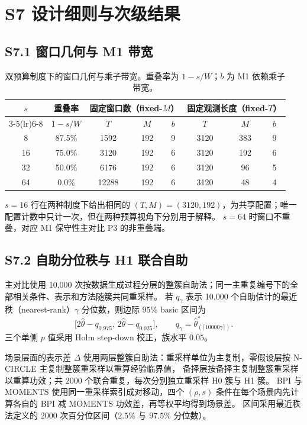 \documentclass[UTF8,zihao=-4]{ctexart}
\theoremstyle{remark}
\begin{document}
\section*{S7 设计细则与次级结果}

\subsection*{S7.1 窗口几何与 M1 带宽}
\begin{table}[ht]
\centering
\small
\caption{双预算制度下的窗口几何与乘子带宽。重叠率为 $1-s/W$；$b$ 为 M1 依赖乘子带宽。}\label{tab:s7-design}
\begin{tabular}{cccccccc}
\toprule
$s$ & 重叠率 & \multicolumn{3}{c}{固定窗口数（fixed-$M$）} & \multicolumn{3}{c}{固定观测长度（fixed-$T$）}\\
\cmidrule(lr){3-5}\cmidrule(lr){6-8}
 & $1-s/W$ & $T$ & $M$ & $b$ & $T$ & $M$ & $b$\\
\midrule
8 & 87.5\% & 1592 & 192 & 9 & 3120 & 383 & 9 \\
16 & 75.0\% & 3120 & 192 & 6 & 3120 & 192 & 6 \\
32 & 50.0\% & 6176 & 192 & 6 & 3120 & 96 & 5 \\
64 & 0.0\% & 12288 & 192 & 6 & 3120 & 48 & 4 \\
\bottomrule
\end{tabular}
\end{table}

$s=16$ 行在两种制度下给出相同的 $(T,M)=(3120,192)$，为共享配置；唯一配置计数中只计一次，但在两种预算视角下分别用于解释。
$s=64$ 时窗口不重叠，对应 M1 保守性主对比 P3 的非重叠端。

\subsection*{S7.2 自助分位秩与 H1 联合自助}
主对比使用 10{,}000 次按数据生成过程分层的整簇自助法；同一主重复编号下的全部相关条件、表示和方法随簇共同重采样。
若 $q_\gamma$ 表示 10{,}000 个自助估计的最近秩（nearest-rank）$\gamma$ 分位数，则边际 $95\%$ basic 区间为
\[
 \bigl[2\widehat\theta-q_{0.975},\,2\widehat\theta-q_{0.025}\bigr],
 \qquad q_\gamma=\widehat\theta^*_{(\lceil10000\gamma\rceil)} .
\]
三个单侧 $p$ 值采用 Holm step-down 校正，族水平 $0.05$。

场景层面的表示差 $\Delta$ 使用两层整簇自助法：重采样单位为主复制，零假设层按 N-CIRCLE 主复制整簇重采样以重算经验临界值，
备择层按备择主复制整簇重采样以重算功效；共 2000 个联合重复，每次分别独立重采样 H0 簇与 H1 簇。
BPI 与 MOMENTS 使用同一重采样索引成对移动，四个 $(\rho,s)$ 条件在每个场景内先计算各自的 BPI 减 MOMENTS 功效差，再等权平均得到场景差。
区间采用最近秩法定义的 2000 次百分位区间（$2.5\%$ 与 $97.5\%$ 分位数）。
\end{document}
